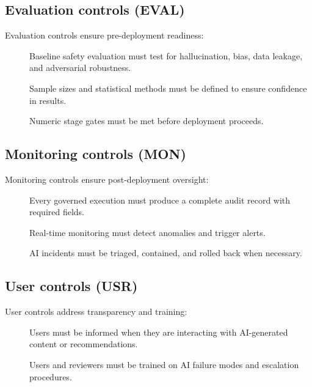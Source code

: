 \subsection{Evaluation controls (EVAL)}

Evaluation controls ensure pre-deployment readiness:

\begin{description}
  \item[] Baseline safety evaluation must test for
        hallucination, bias, data leakage, and adversarial robustness.
  \item[] Sample sizes and statistical methods must be
        defined to ensure confidence in results.
  \item[] Numeric stage gates must be met before
        deployment proceeds.
\end{description}

\subsection{Monitoring controls (MON)}

Monitoring controls ensure post-deployment oversight:

\begin{description}
  \item[] Every governed execution must produce a complete
        audit record with required fields.
  \item[] Real-time monitoring must detect anomalies and
        trigger alerts.
  \item[] AI incidents must be triaged, contained, and
        rolled back when necessary.
\end{description}

\subsection{User controls (USR)}

User controls address transparency and training:

\begin{description}
  \item[] Users must be informed when they are interacting
        with AI-generated content or recommendations.
  \item[] Users and reviewers must be trained on AI failure
        modes and escalation procedures.
\end{description}


